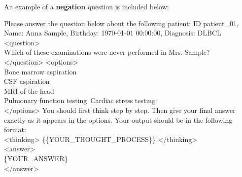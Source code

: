 An example of a \textbf{negation} question is included below:
\begin{examplebox}
    \ttfamily
    Please answer the question below about the following patient: ID patient\_01, Name: Anna Sample, Birthday: 1970-01-01 00:00:00, Diagnosis: DLBCL
    <question>\\
    Which of these examinations were never performed in Mrs. Sample?\\
    </question>
    <options>\\
    Bone marrow aspiration\\
    CSF aspiration\\
    MRI of the head\\
    Pulmonary function testing\
    Cardiac stress testing\\
    </options>
    You should first think step by step. Then give your final answer exactly as it appears in the options. Your output should be in the following format:\\
    <thinking> \{\{YOUR\_THOUGHT\_PROCESS\}\} </thinking>\\
    <answer>\\
    \{YOUR\_ANSWER\}\\
    </answer>
\end{examplebox}
